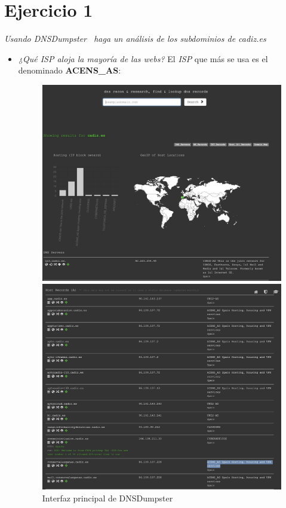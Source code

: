 \documentclass[12pt]{book}
\begin{document}
\section{Ejercicio 1}
\textit{Usando DNSDumpster~\cite{DNSDumpster} haga un análisis de los subdominios de cadiz.es}
\begin{itemize}
    \item \textit{¿Qué ISP aloja la mayoría de las webs?}
    \newline
    El \textit{ISP} que más se usa es el denominado \textbf{ACENS\_AS}:
    \begin{figure}[h]
    \begin{minipage}{.5\textwidth}
        \centering
        \includegraphics[width=.9\linewidth]{Practica 3y4/images/Screenshot 2024-10-31 at 09.06.31.png}
        \caption{Interfaz principal de DNSDumpster}
        \label{fig:enter-label}
    \end{minipage}
    \hfill
    \begin{minipage}{.5\textwidth}
        \centering
        \includegraphics[width=.9\linewidth]{Practica 3y4/images/Screenshot 2024-10-31 at 09.13.01.png}

\end{minipage}
\end{figure}
\end{itemize}
\end{document}
